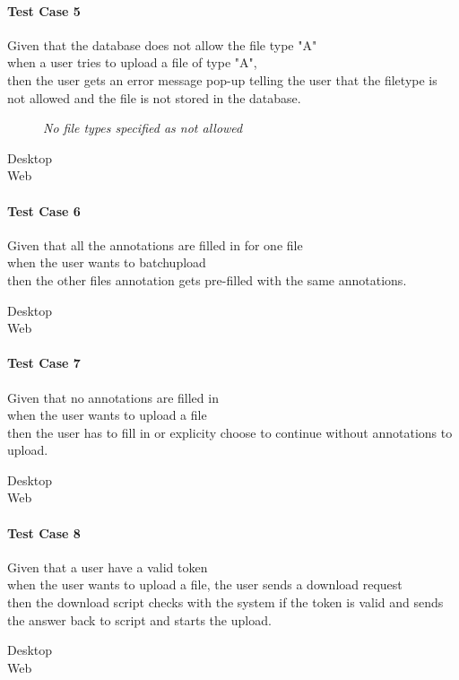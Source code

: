 \paragraph*{Test Case 5}
Given that the database does not allow the file type "A" \\ when a user tries to upload a file of type "A", \\ then the user gets an error message pop-up telling the user that the filetype is not allowed and the file is not stored in the database.

\begin{description}
 \item[] \emph{No file types specified as not allowed}
 \item[Desktop]
 \item[Web] 
\end{description}
\paragraph*{Test Case 6}
Given that all the annotations are filled in for one file \\ when the user wants to batchupload \\ then the other files annotation gets pre-filled with the same annotations.
\begin{description}
 \item[Desktop] 
 \item[Web] \cmark
\end{description}
\paragraph*{Test Case 7}
Given that no annotations are filled in \\ when the user wants to upload a file \\ then the user has to fill in or explicity choose to continue without annotations to upload.
\begin{description}
 \item[Desktop]
 \item[Web] \cmark
\end{description}
\paragraph*{Test Case 8}
Given that a user have a valid token \\ when the user wants to upload a file, the user sends a download request \\ then the download script checks with the system if the token is valid and sends the answer back to script and starts the upload.
\begin{description}
 \item[Desktop]
 \item[Web] \cmark
\end{description}
